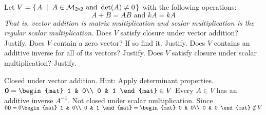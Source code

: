 
\begin{Exercise}[
name={},
title={}, 
difficulty=0,
origin={\cite{YL}}]
Let $V=\mbox{$\left\{\hspace{0.1em}A \;\;\middle|\;\; A \in\mathcal{M}_{2 \! \times \! 2} \text{ and } \operatorname{det}(A)\neq 0 \hspace{0.1em}\right\}$}$
with the following operations:
\[
A+B=AB \text{ and } kA=kA
\]
\textit{That is, vector addition is matrix multiplication and scalar multiplication is the regular scalar multiplication.}
\Question Does $V$ satisfy closure under vector addition? Justify.
\Question Does $V$ contain a zero vector? If so find it.  Justify.
\Question Does $V$ contains an additive inverse for all of its vectors? Justify.
\Question Does $V$ satisfy closure under scalar multiplication? Justify.

\end{Exercise}

\begin{Answer}
\Question Closed under vector addition.  Hint: Apply determinant properties.
\Question 
$\vec{0}
=\begin{mat}
1 & 0\\
0 & 1
\end{mat}\in V$
\Question Every $A\in V$ has an additive inverse $A^{-1}$.
\Question Not closed under scalar multiplication. Since 
$0\vec{0}=
0\begin{mat}
1 & 0\\
0 & 1
\end{mat}=
\begin{mat}
0 & 0\\
0 & 0
\end{mat}\not\in V$
\end{Answer}
